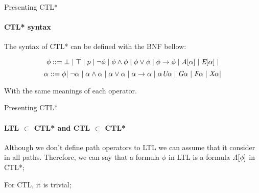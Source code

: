\begin{frame}{Presenting CTL*}
    \framesubtitle{CTL* syntax}
    The syntax of CTL* can be defined with the BNF bellow:
    
    	$$\phi ::= \bot \; | \; \top \; | \; p \; | \; \neg \phi \; | \; \phi \land \phi \; | \; \phi \lor \phi \; | \; \phi \to \phi \; | \; \textit{A}[\alpha] \; | \; \textit{E}[\alpha] \; | $$
        $$\alpha ::= \phi |  \; \neg \alpha \; | \; \alpha \land \alpha \; | \; \alpha \lor \alpha \; | \; \alpha \to \alpha \; | \; \alpha \textit{U} \alpha \; | \; \textit{G} \alpha \; | \; \textit{F} \alpha \; | \; \textit{X}\alpha |$$
        
        With the same meanings of each operator.
\end{frame}

\begin{frame}{Presenting CTL*}
    \framesubtitle{LTL $\subset$ CTL* and CTL $\subset$ CTL*}
    Although we don't define path operators to LTL we can assume that it consider in all paths. Therefore, we can say that a formula $\phi$ in LTL is a formula $\textit{A}[\phi]$ in CTL*;\pause
    
    For CTL, it is trivial;
\end{frame}


